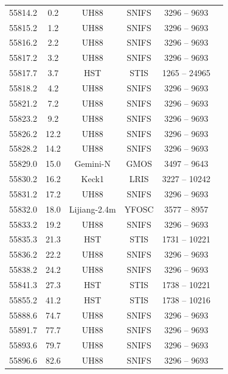 \documentclass[a4paper,oneside,12pt, class=Latex/Classes/PhDthesisPSnPDF, crop=false]{standalone}
\begin{document}
\begin{longtable}{cccccc}
 55814.2 & 0.2 & UH88   & SNIFS & 3296 -- 9693 & \citet{spec_UH88} \\
 55815.2 & 1.2 & UH88   & SNIFS & 3296 -- 9693 & \citet{spec_UH88} \\
 55816.2 & 2.2 & UH88   & SNIFS & 3296 -- 9693 & \citet{spec_UH88} \\
 55817.2 & 3.2 & UH88   & SNIFS & 3296 -- 9693 & \citet{spec_UH88} \\
 55817.7 & 3.7 & HST   & STIS & 1265 -- 24965 & \citet{spec_HST} \\
 55818.2 & 4.2 & UH88   & SNIFS & 3296 -- 9693 & \citet{spec_UH88} \\
 55821.2 & 7.2 & UH88   & SNIFS & 3296 -- 9693 & \citet{spec_UH88} \\
 55823.2 & 9.2 & UH88   & SNIFS & 3296 -- 9693 & \citet{spec_UH88} \\
 55826.2 & 12.2 & UH88   & SNIFS & 3296 -- 9693 & \citet{spec_UH88} \\
 55828.2 & 14.2 & UH88   & SNIFS & 3296 -- 9693 & \citet{spec_UH88} \\
 55829.0 & 15.0 & Gemini-N  & GMOS & 3497 -- 9643 & \citet{spec_Gemini-N} \\
 55830.2 & 16.2 & Keck1  & LRIS & 3227 -- 10242 & \citet{spec_Lick-3m} \\
 55831.2 & 17.2 & UH88   & SNIFS & 3296 -- 9693 & \citet{spec_UH88} \\
 55832.0 & 18.0 & Lijiang-2.4m & YFOSC & 3577 -- 8957 & \citet{spec_Lijiang-2.4m} \\
 55833.2 & 19.2 & UH88   & SNIFS & 3296 -- 9693 & \citet{spec_UH88} \\
 55835.3 & 21.3 & HST   & STIS & 1731 -- 10221 & \citet{spec_HST} \\
 55836.2 & 22.2 & UH88   & SNIFS & 3296 -- 9693 & \citet{spec_UH88} \\
 55838.2 & 24.2 & UH88   & SNIFS & 3296 -- 9693 & \citet{spec_UH88} \\
 55841.3 & 27.3 & HST   & STIS & 1738 -- 10221 & \citet{spec_HST} \\
 55855.2 & 41.2 & HST   & STIS & 1738 -- 10216 & \citet{spec_HST} \\
 55888.6 & 74.7 & UH88   & SNIFS & 3296 -- 9693 & \citet{spec_UH88} \\
 55891.7 & 77.7 & UH88   & SNIFS & 3296 -- 9693 & \citet{spec_UH88} \\
 55893.6 & 79.7 & UH88   & SNIFS & 3296 -- 9693 & \citet{spec_UH88} \\
 55896.6 & 82.6 & UH88   & SNIFS & 3296 -- 9693 & \citet{spec_UH88} \\

\end{longtable}
\end{document}
